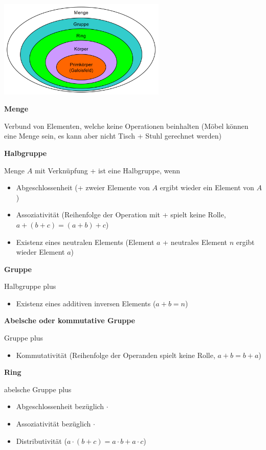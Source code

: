 \includegraphics[width=8cm]{img/algebraische_strukturen.PNG}

\textbf{Menge}

Verbund von Elementen, welche keine Operationen beinhalten (Möbel können eine Menge sein, es kann aber nicht Tisch + Stuhl gerechnet werden)

\textbf{Halbgruppe}

Menge $A$ mit Verknüpfung \frqq +\flqq{} ist eine Halbgruppe, wenn
\begin{itemize}
    \item Abgeschlossenheit (+ zweier Elemente von $A$ ergibt wieder ein Element von $A$)
    \item Assoziativität (Reihenfolge der Operation mit + spielt keine Rolle, $a + (b + c) = (a + b) + c$)
    \item Existenz eines neutralen Elements (Element $a$ + neutrales Element $n$ ergibt wieder Element $a$)
\end{itemize}

\textbf{Gruppe}

Halbgruppe plus
\begin{itemize}
    \item Existenz eines additiven inversen Elements ($a + b = n$)
\end{itemize}

\textbf{Abelsche oder kommutative Gruppe}

Gruppe plus
\begin{itemize}
    \item Kommutativität (Reihenfolge der Operanden spielt keine Rolle, $a + b = b + a$)
\end{itemize}

\textbf{Ring}

abelsche Gruppe plus
\begin{itemize}
    \item Abgeschlossenheit bezüglich \frqq $\cdot$\flqq
    \item Assoziativität bezüglich \frqq $\cdot$\flqq
    \item Distributivität ($a \cdot (b + c) = a \cdot b + a \cdot c$)
\end{itemize}

